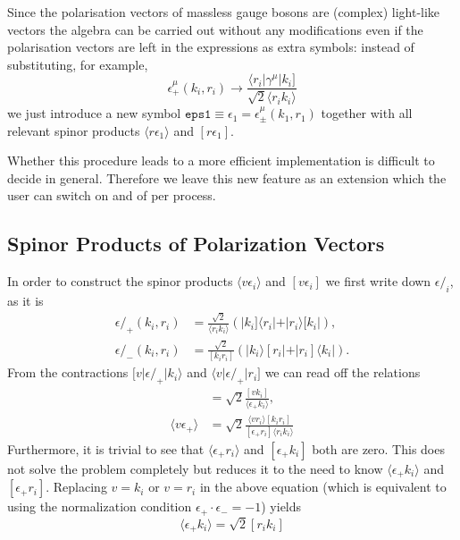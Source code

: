 \documentclass[11pt,a4paper]{refrep}
\newcommand{\fmslash}[1]{{#1}\!\!\!/}
\begin{document}
Since the polarisation vectors of massless gauge bosons are (complex)
light-like vectors the algebra can be carried out without any modifications
even if the polarisation vectors are left in the expressions as extra symbols:
instead of substituting, for example,
\begin{equation}\label{eq:def-epsplus}
\epsilon^\mu_+(k_i, r_i)\to\frac{\langle r_i\vert\gamma^\mu\vert k_i]}%
{\sqrt{2}\langle r_ik_i\rangle}
\end{equation}
we just introduce a new symbol
$\mathtt{eps1}\equiv\epsilon_1=\epsilon^\mu_\pm(k_1, r_1)$
together with all relevant spinor products $\langle r\epsilon_1\rangle$
and $[r\epsilon_1]$.

Whether this procedure leads to a more efficient implementation is difficult
to decide in general. Therefore we leave this new feature as an extension
which the user can switch on and of per process.

\subsection{Spinor Products of Polarization Vectors}
In order to construct the spinor products $\langle v\epsilon_i\rangle$
and $[v\epsilon_i]$ we first write down $\fmslash{\epsilon}_i$, as it is
\begin{align}
\fmslash{\epsilon}_+(k_i, r_i) &=\frac{\sqrt{2}}{\langle r_ik_i\rangle}
\left(\vert k_i]\langle r_i\vert + \vert r_i\rangle[k_i\vert\right),\\
\fmslash{\epsilon}_-(k_i, r_i) &=\frac{\sqrt{2}}{[k_ir_i]}
\left(\vert k_i\rangle[r_i\vert + \vert r_i]\langle k_i\vert\right).
\end{align}
From the contractions $[v\vert\fmslash{\epsilon}_+\vert k_i\rangle$
and $\langle v\vert\fmslash{\epsilon}_+\vert r_i]$ we can read off
the relations
\begin{align}
[v\epsilon_+] &= \sqrt{2}\frac{[vk_i]}{\langle\epsilon_+k_i\rangle},\\
\langle v\epsilon_+\rangle &=\sqrt{2}\frac%
{\langle vr_i\rangle[k_ir_i]}{[\epsilon_+r_i]\langle r_ik_i\rangle}
\end{align}
Furthermore, it is trivial to see that $\langle\epsilon_+r_i\rangle$
and $[\epsilon_+k_i]$ both are zero.
This does not solve the problem completely but reduces it to the need to know
$\langle\epsilon_+k_i\rangle$ and $[\epsilon_+r_i]$. Replacing
$v=k_i$ or $v=r_i$ in the above equation (which is equivalent to
using the normalization condition $\epsilon_+\cdot\epsilon_-=-1$)
yields
\begin{equation}
[r_i\epsilon_+]\langle\epsilon_+k_i\rangle = \sqrt{2}[r_ik_i]
\end{equation}
\end{document}
